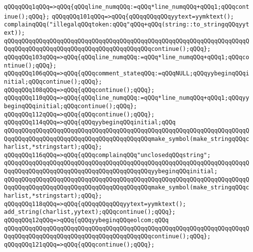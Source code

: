 \verb|qQQqqQQq1qQQq=>qQQq{qQQqline_numqQQq:=qQQq*line_numqQQq+qQQq1;qQQqcontinue();qQQq};|\newline
\verb|qQQqqQQq101qQQq=>qQQq{qQQqqQQqqQQqyytext=yymktext();|\newline
\verb|complainqQQq("illegalqQQqtoken:qQQq"qQQq+qQQq(string::to_stringqQQqyytext));|\newline
\verb|qQQqqQQqqQQqqQQqqQQqqQQqqQQqqQQqqQQqqQQqqQQqqQQqqQQqqQQqqQQqqQQqqQQqqQQqqQQqqQQqqQQqqQQqqQQqqQQqqQQqqQQqqQQqqQQqcontinue();qQQq};|\newline
\verb|qQQqqQQq103qQQq=>qQQq{qQQqline_numqQQq:=qQQq*line_numqQQq+qQQq1;qQQqcontinue();qQQq};|\newline
\verb|qQQqqQQq106qQQq=>qQQq{qQQqcomment_stateqQQq:=qQQqNULL;qQQqyybeginqQQqinitial;qQQqcontinue();qQQq};|\newline
\verb|qQQqqQQq108qQQq=>qQQq{qQQqcontinue();qQQq};|\newline
\verb|qQQqqQQq110qQQq=>qQQq{qQQqline_numqQQq:=qQQq*line_numqQQq+qQQq1;qQQqyybeginqQQqinitial;qQQqcontinue();qQQq};|\newline
\verb|qQQqqQQq112qQQq=>qQQq{qQQqcontinue();qQQq};|\newline
\verb|qQQqqQQq114qQQq=>qQQq{qQQqyybeginqQQqinitial;qQQq|\newline
\verb|qQQqqQQqqQQqqQQqqQQqqQQqqQQqqQQqqQQqqQQqqQQqqQQqqQQqqQQqqQQqqQQqqQQqqQQqqQQqqQQqqQQqqQQqqQQqqQQqqQQqqQQqqQQqqQQqmake_symbol(make_stringqQQqcharlist,*stringstart);qQQq};|\newline
\verb|qQQqqQQq116qQQq=>qQQq{qQQqcomplainqQQq"unclosedqQQqstring";|\newline
\verb|qQQqqQQqqQQqqQQqqQQqqQQqqQQqqQQqqQQqqQQqqQQqqQQqqQQqqQQqqQQqqQQqqQQqqQQqqQQqqQQqqQQqqQQqqQQqqQQqqQQqqQQqqQQqqQQqyybeginqQQqinitial;|\newline
\verb|qQQqqQQqqQQqqQQqqQQqqQQqqQQqqQQqqQQqqQQqqQQqqQQqqQQqqQQqqQQqqQQqqQQqqQQqqQQqqQQqqQQqqQQqqQQqqQQqqQQqqQQqqQQqqQQqmake_symbol(make_stringqQQqcharlist,*stringstart);qQQq};|\newline
\verb|qQQqqQQq118qQQq=>qQQq{qQQqqQQqqQQqyytext=yymktext();|\newline
\verb|add_string(charlist,yytext);qQQqcontinue();qQQq};|\newline
\verb|qQQqqQQq12qQQq=>qQQq{qQQqyybeginqQQqeolcom;qQQq|\newline
\verb|qQQqqQQqqQQqqQQqqQQqqQQqqQQqqQQqqQQqqQQqqQQqqQQqqQQqqQQqqQQqqQQqqQQqqQQqqQQqqQQqqQQqqQQqqQQqqQQqqQQqqQQqqQQqqQQqcontinue();qQQq};|\newline
\verb|qQQqqQQq121qQQq=>qQQq{qQQqcontinue();qQQq};|\newline
